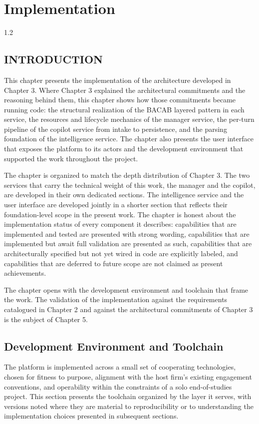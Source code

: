 \chapter{Implementation}
\begin{spacing}{1.2}
\minitoc
\thispagestyle{MyStyle}
\end{spacing}
\newpage

\section{INTRODUCTION}
This chapter presents the implementation of the architecture developed in Chapter 3. Where Chapter 3 explained the architectural commitments and the reasoning behind them, this chapter shows how those commitments became running code: the structural realization of the BACAB layered pattern in each service, the resources and lifecycle mechanics of the manager service, the per-turn pipeline of the copilot service from intake to persistence, and the parsing foundation of the intelligence service. The chapter also presents the user interface that exposes the platform to its actors and the development environment that supported the work throughout the project.

The chapter is organized to match the depth distribution of Chapter 3. The two services that carry the technical weight of this work, the manager and the copilot, are developed in their own dedicated sections. The intelligence service and the user interface are developed jointly in a shorter section that reflects their foundation-level scope in the present work. The chapter is honest about the implementation status of every component it describes: capabilities that are implemented and tested are presented with strong wording, capabilities that are implemented but await full validation are presented as such, capabilities that are architecturally specified but not yet wired in code are explicitly labeled, and capabilities that are deferred to future scope are not claimed as present achievements.

The chapter opens with the development environment and toolchain that frame the work. The validation of the implementation against the requirements catalogued in Chapter 2 and against the architectural commitments of Chapter 3 is the subject of Chapter 5.

\section{Development Environment and Toolchain}
The platform is implemented across a small set of cooperating technologies, chosen for fitness to purpose, alignment with the host firm's existing engagement conventions, and operability within the constraints of a solo end-of-studies project. This section presents the toolchain organized by the layer it serves, with versions noted where they are material to reproducibility or to understanding the implementation choices presented in subsequent sections.

